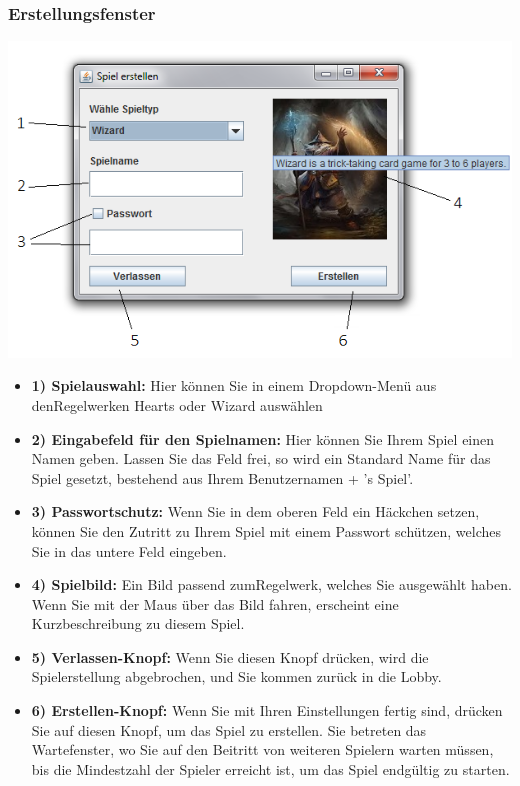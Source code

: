 \documentclass[titlepage,10pt,a4paper]{article}
\begin{document}
\subsubsection{Erstellungsfenster}
\includegraphics[width=\textwidth]{Erstellungs-Fenster}
\begin{itemize}
	\item \textbf{1) Spielauswahl:} Hier können Sie in einem Dropdown-Menü aus den\gls{Regelwerk}en Hearts oder Wizard auswählen
	\item \textbf{2) Eingabefeld für den Spielnamen:} Hier können Sie Ihrem Spiel einen Namen geben. Lassen Sie das Feld frei, so wird ein Standard Name für das Spiel gesetzt, bestehend aus Ihrem Benutzernamen + 's Spiel'.
	\item \textbf{3) Passwortschutz:} Wenn Sie in dem oberen Feld ein Häckchen setzen, können Sie den Zutritt zu Ihrem Spiel mit einem Passwort schützen, welches Sie in das untere Feld eingeben.
	\item \textbf{4) Spielbild:} Ein Bild passend zum\gls{Regelwerk}, welches Sie ausgewählt haben. Wenn Sie mit der Maus über das Bild fahren, erscheint eine Kurzbeschreibung zu diesem Spiel.
	\item \textbf{5) Verlassen-Knopf:} Wenn Sie diesen Knopf drücken, wird die Spielerstellung abgebrochen, und Sie kommen zurück in die Lobby.
	\item \textbf{6) Erstellen-Knopf:} Wenn Sie mit Ihren Einstellungen fertig sind, drücken Sie auf diesen Knopf, um das Spiel zu erstellen. Sie betreten das \gls{Wartefenster}, wo Sie auf den Beitritt von weiteren Spielern warten müssen, bis die Mindestzahl der Spieler erreicht ist, um das Spiel endgültig zu starten.	
\end{itemize}
\end{document}
